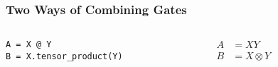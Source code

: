 \documentclass{beamer}
\newcommand{\verbatimsize}{\footnotesize}
\begin{document}
\begin{frame}[fragile]
    \frametitle{Two Ways of Combining Gates}
    \begin{columns}
        \begin{column}{0.3\textwidth}
            \verbatimsize
\begin{verbatim}
A = X @ Y
B = X.tensor_product(Y)
\end{verbatim}
        \end{column}
        \begin{column}{0.3\textwidth}
            \begin{align*}
                A & = X Y \\
                B & = X \otimes Y
            \end{align*}
        \end{column}
        \begin{column}{0.3\textwidth}
            \begin{center}
            \end{center}
            \begin{center}
            \end{center}
        \end{column}
    \end{columns}
\end{frame}
\end{document}
